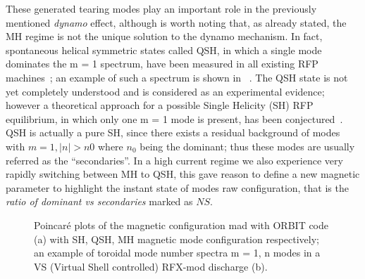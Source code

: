 These generated tearing modes play an important role in the previously mentioned \textit{dynamo} effect, although is worth noting that, as already stated, the MH regime is not the unique solution to the dynamo mechanism. In fact, spontaneous helical symmetric states called \acl{QSH}, in which a single mode dominates the m = 1 spectrum, have been measured in all existing RFP machines~\cite{Martin_1999}; an example of such a spectrum is shown in~\Figure{\ref{fig:MHQSH_b}} . The QSH state is not yet completely understood and is considered as an experimental evidence; however a theoretical approach for a possible Single Helicity (SH) RFP equilibrium, in which only one m = 1 mode is present, has been conjectured~\cite{Cappello_1996}. QSH is actually a pure SH, since there exists a residual background of modes with $m = 1, |n| > n0$ where $n_0$ being the dominant; thus these modes are usually referred as the “secondaries”. In a high current regime we also experience very rapidly switching between MH to QSH, this gave reason to define a new magnetic parameter to highlight the instant state of modes raw configuration, that is the \textit{ratio of dominant vs secondaries} marked as $NS$.
\begin{figure}
    \centering
    \caption{Poincaré plots of the magnetic configuration mad with ORBIT code (a) with SH, QSH, MH magnetic mode configuration     respectively; an example of toroidal mode number spectra m = 1, n modes in a VS (Virtual Shell controlled) RFX-mod discharge (b). }
    \label{img:MHQSH_b}
\end{figure}















